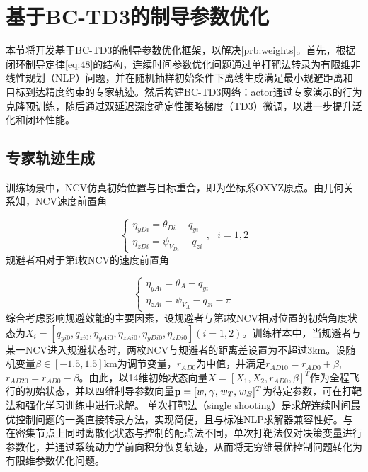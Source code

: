 \section{基于BC-TD3的制导参数优化}
本节将开发基于BC-TD3的制导参数优化框架，以解决\cref{prb:weights}。首先，根据闭环制导定律\eqref{eq:48}的结构，连续时间参数优化问题通过单打靶法转录为有限维非线性规划（NLP）问题，并在随机抽样初始条件下离线生成满足最小规避距离和目标到达精度约束的专家轨迹。然后构建BC-TD3网络：actor通过专家演示的行为克隆预训练，随后通过双延迟深度确定性策略梯度（TD3）微调，以进一步提升泛化和闭环性能。

\subsection{专家轨迹生成}
训练场景中，NCV仿真初始位置与目标重合，即为坐标系OXYZ原点。由几何关系知，NCV速度前置角

\begin{equation}
\label{eq:67}
\left\{ {\begin{array}{*{20}{l}}
  {{\eta _{yDi}} = {\theta _{Di}} - {q_{yi}}} \\ 
  {{\eta _{zDi}} = {\psi _{{V_{Di}}}} - {q_{zi}}} 
\end{array},{\text{ }}i = 1,2} \right.
\end{equation}
规避者相对于第i枚NCV的速度前置角

\begin{equation}
\label{eq:68}
\left\{ {\begin{array}{*{20}{l}}
  {{\eta _{yAi}} = {\theta _A} + {q_{yi}}} \\ 
  {{\eta _{zAi}} = {\psi _{{V_A}}} - {q_{zi}} - \pi } 
\end{array}} \right.
\end{equation}
综合考虑影响规避效能的主要因素，设规避者与第i枚NCV相对位置的初始角度状态为${X_i} = [{q_{yi0}},{q_{zi0}},{\eta _{yAi0}},{\eta _{zAi0}},{\eta _{yDi0}},{\eta _{zDi0}}](i = 1,2)$。训练样本中，当规避者与某一NCV进入规避状态时，两枚NCV与规避者的距离差设置为不超过3km。设随机变量$\beta  \in [ - 1.5,1.5]{\text{km}}$为调节变量，${r_{AD{\text{0}}}}$为中值，并满足${r_{AD10}} = {r_{AD0}} + \beta $, ${r_{AD20}} = {r_{AD0}} - \beta $。由此，以14维初始状态向量$X = {[{X_1},{X_2},{r_{AD0}},\beta ]^T}$作为全程飞行的初始状态，并以四维制导参数向量${\mathbf{p}} = {[w,{\kern 1pt} \gamma ,{\kern 1pt} {w_T},{\kern 1pt} {w_E}]^T}$为待定参数，可在打靶法和强化学习训练中进行求解。
单次打靶法（single shooting）是求解连续时间最优控制问题的一类直接转录方法，实现简便，且与标准NLP求解器兼容性好。与在密集节点上同时离散化状态与控制的配点法不同，单次打靶法仅对决策变量进行参数化，并通过系统动力学前向积分恢复轨迹，从而将无穷维最优控制问题转化为有限维参数优化问题。

